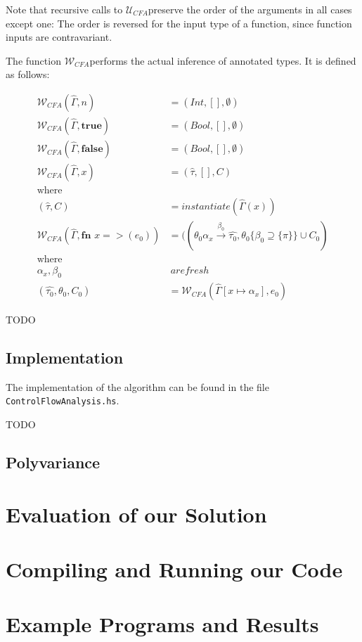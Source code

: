 \documentclass[a4paper,11pt]{article}
\newcommand{\bigU}{\ensuremath{\mathcal{U}_{CFA}}}
\newcommand{\bigW}{\ensuremath{\mathcal{W}_{CFA}}}
\begin{document}
Note that recursive calls to \bigU preserve the order of the arguments in all cases except one: The order is reversed for the input type of a function, since function inputs are contravariant.

The function \bigW performs the actual inference of annotated types. It is defined as follows:

\begin{align*}
  \bigW (\hat{\Gamma}, n) &= (Int, [], \emptyset)\\
  \bigW (\hat{\Gamma}, \textbf{true}) &= (Bool, [], \emptyset)\\
  \bigW (\hat{\Gamma}, \textbf{false}) &= (Bool, [], \emptyset)\\
  \bigW (\hat{\Gamma}, x) &= (\hat{\tau}, [], C)\\ 
  \text{where}\\
  (\hat{\tau}, C) &= instantiate (\hat{\Gamma}(x))\\
  \bigW (\hat{\Gamma}, \textbf{fn }x=> (e_0)) &= ((\theta_0 \alpha_x \xrightarrow{\beta_0} \hat{\tau_0}, \theta_0 \{\beta_0 \supseteq \{\pi\}\} \cup C_0)\\
  \text{where}\\
  \alpha_x, \beta_0 & ~are fresh\\
  (\hat{\tau_0}, \theta_0, C_0) &= \bigW (\hat{\Gamma}[x \mapsto \alpha_x], e_0)
\end{align*}


TODO

\subsection{Implementation}
The implementation of the algorithm can be found in the file \texttt{ControlFlowAnalysis.hs}. 

TODO

\subsection{Polyvariance}


\section{Evaluation of our Solution}


\section{Compiling and Running our Code}


\section{Example Programs and Results}
\end{document}
